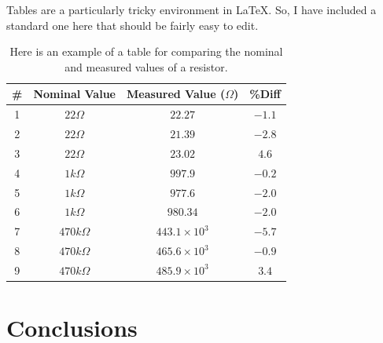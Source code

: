 \documentclass[11pt,letterpaper]{article} %
\begin{document}
Tables are a particularly tricky environment in LaTeX. So, I have included a standard one here that should be fairly easy to edit. 

\begin{table}[ht] %
  \begin{center} %
    \begin{tabular}{ | c | c | c | c |} %
        \hline %
\# & Nominal Value & Measured Value ($\Omega$) & \%Diff \\ \hline %
1 & $22\Omega$   & $22.27$             & $-1.1$ \\ 
2 & $22\Omega$   & $21.39$             & $-2.8$ \\ 
3 & $22\Omega$   & $23.02$             & $4.6$  \\ 
4 & $1k\Omega$   & $997.9$             & $-0.2$ \\ 
5 & $1k\Omega$   & $977.6$             & $-2.0$ \\ 
6 & $1k\Omega$   & $980.34$            & $-2.0$ \\ 
7 & $470k\Omega$ & $443.1\times{}10^3$ & $-5.7$ \\ 
8 & $470k\Omega$ & $465.6\times{}10^3$ & $-0.9$ \\ 
9 & $470k\Omega$ & $485.9\times{}10^3$ & $3.4$  \\ 
    \hline
    \end{tabular}
    \end{center}
        \caption{Here is an example of a table for comparing the nominal and measured values of a resistor.} %
    \label{tb:resistors} %
\end{table} %

\section{Conclusions}
\end{document}
